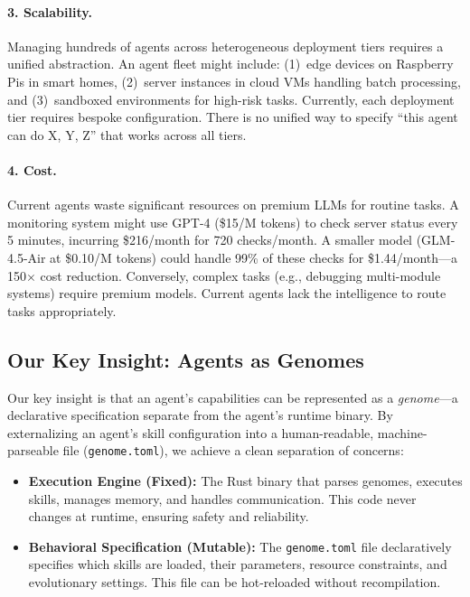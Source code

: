\documentclass{article}
\newcommand{\genome}{\texttt{genome.toml}}
\begin{document}
\paragraph{3. Scalability.}
Managing hundreds of agents across heterogeneous deployment tiers requires a unified abstraction. An agent fleet might include: (1)~edge devices on Raspberry Pis in smart homes, (2)~server instances in cloud VMs handling batch processing, and (3)~sandboxed environments for high-risk tasks. Currently, each deployment tier requires bespoke configuration. There is no unified way to specify ``this agent can do X, Y, Z'' that works across all tiers.

\paragraph{4. Cost.}
Current agents waste significant resources on premium LLMs for routine tasks. A monitoring system might use GPT-4 (\$15/M tokens) to check server status every 5 minutes, incurring \$216/month for 720 checks/month. A smaller model (GLM-4.5-Air at \$0.10/M tokens) could handle 99\% of these checks for \$1.44/month---a 150$\times$ cost reduction. Conversely, complex tasks (e.g., debugging multi-module systems) require premium models. Current agents lack the intelligence to route tasks appropriately.

\subsection{Our Key Insight: Agents as Genomes}

Our key insight is that an agent's capabilities can be represented as a \textit{genome}---a declarative specification separate from the agent's runtime binary. By externalizing an agent's skill configuration into a human-readable, machine-parseable file (\genome{}), we achieve a clean separation of concerns:

\begin{itemize}[leftmargin=*]
    \item \textbf{Execution Engine (Fixed):} The Rust binary that parses genomes, executes skills, manages memory, and handles communication. This code never changes at runtime, ensuring safety and reliability.
    
    \item \textbf{Behavioral Specification (Mutable):} The \genome{} file declaratively specifies which skills are loaded, their parameters, resource constraints, and evolutionary settings. This file can be hot-reloaded without recompilation.
\end{itemize}
\end{document}
